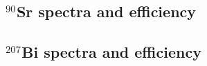 \documentclass[11pt]{article}
\newcommand{\nuc}[2]{\ensuremath{^{#1}}#2}
\begin{document}

\subsection{\nuc{90}{Sr} spectra and efficiency}

\subsection{\nuc{207}{Bi} spectra and efficiency}
 
\end{document}
